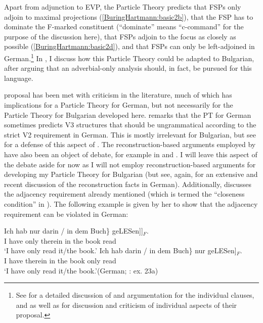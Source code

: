 \documentclass[output=paper,colorlinks,citecolor=brown]{langscibook}
\begin{document}
\noindent Apart from adjunction to EVP, the Particle Theory predicts that FSPs only adjoin to maximal projections (\ref{BuringHartmann:basic2b}), that the FSP has to dominate the F-marked constituent  (``dominate'' means ``c-command'' for the purpose of the discussion here), that FSPs adjoin to the focus as closely as possible (\ref{BuringHartmann:basic2d}), and that FSPs can only be left-adjoined in German.\footnote{See \citet{BuringHartmann2001} for a detailed discussion of and argumentation for the individual clauses, and \citet{Sudhoff2010} as well as \citet{Mursell2021} for discussion and criticism of individual aspects of their proposal.} In , I discuss how this Particle Theory could be adapted to Bulgarian, after arguing that an adverbial-only analysis should, in fact, be pursued for this language. \par 
{} proposal has been met with criticism in the literature, much of which has implications for a Particle Theory for German, but not necessarily for the Particle Theory for Bulgarian developed here. \citet{Reis2005} remarks that the PT for German sometimes predicts V3 structures that should be ungrammatical according to the strict V2 requirement in German. This is mostly irrelevant for Bulgarian, but see \citet{Mursell2021} for a defense of this aspect of \citet{BuringHartmann2001}. The reconstruction-based arguments employed by \citet[Section 5]{BuringHartmann2001} have also been an object of debate, for example in \citet{MeyerSauerland2009} and \citet{SmeetsWagner2018}. I will leave this aspect of the debate aside for now as I will not employ reconstruction-based arguments for developing my Particle Theory for Bulgarian (but see, again, \citealt{Mursell2021} for an extensive and recent discussion of the reconstruction facts in German). Additionally, \citet{Reis2005} discusses the adjacency requirement already mentioned (which is termed the ``closeness condition'' in \citealt{Reis2005}). The following example is given by her to show that the adjacency requirement can be violated in German:

\ea\label{Reis1} 
\ea
\gll Ich hab nur \minsp{\{} darin / in dem Buch\} \minsp{[} geLESen]]$_{F}$. \\
I have only {} therein {} in the book {} read \\
\glt `I have only read it/the book.’\label{Reis1a}
\ex
\gll Ich hab \minsp{\{} darin / in dem Buch\} nur \minsp{[} geLESen]$_{F}$.\\
I have {} therein {} in the book only {} read \\
\glt `I have only read it/the book.’\label{Reis1b}\hfill (German; \citealt{Reis2005}: ex. 23a) 
\z 
\z 
\end{document}
